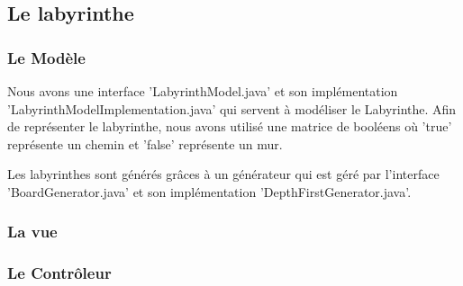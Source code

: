 \subsection{Le labyrinthe}
\label{subsec:labyrinthe}


\subsubsection{Le Modèle}

Nous avons une interface 'LabyrinthModel.java' et son implémentation 'LabyrinthModelImplementation.java' qui servent à modéliser le Labyrinthe. Afin de représenter le labyrinthe, nous avons utilisé une matrice de booléens où 'true' représente un chemin et 'false' représente un mur.

Les labyrinthes sont générés grâces à un générateur qui est géré par l'interface 'BoardGenerator.java' et son implémentation 'DepthFirstGenerator.java'.

\subsubsection{La vue}

\subsubsection{Le Contrôleur}








